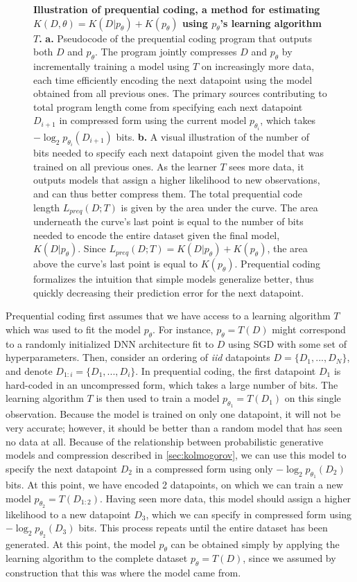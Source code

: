 \documentclass{article} %
\begin{document}
\begin{appendices}
\begin{figure}[ht]
    \caption{\textbf{Illustration of prequential coding, a method for estimating $K(D, \theta) = K(D|p_\theta) + K(p_\theta)$ using $p_\theta$'s learning algorithm $T$.} \textbf{a.} Pseudocode of the prequential coding program that outputs both $D$ and $p_\theta$. The program jointly compresses $D$ and $p_\theta$ by incrementally training a model using $T$ on increasingly more data, each time efficiently encoding the next datapoint using the model obtained from all previous ones. The primary sources contributing to total program length come from specifying each next datapoint $D_{i+1}$ in compressed form using the current model $p_{\theta_i}$, which takes $-\log_2 p_{\theta_i}(D_{i+1})$ bits. \textbf{b.} A visual illustration of the number of bits needed to specify each next datapoint given the model that was trained on all previous ones. As the learner $T$ sees more data, it outputs models that assign a higher likelihood to new observations, and can thus better compress them. The total prequential code length $L_{preq}(D; T)$ is given by the area under the curve. The area underneath the curve's last point is equal to the number of bits needed to encode the entire dataset given the final model, $K(D|p_\theta)$. Since $L_{preq}(D; T) = K(D|p_\theta) + K(p_\theta)$, the area above the curve's last point is equal to $K(p_\theta)$. Prequential coding formalizes the intuition that simple models generalize better, thus quickly decreasing their prediction error for the next datapoint.}
    \label{fig:prequential_coding}
\end{figure}

Prequential coding first assumes that we have access to a learning algorithm $T$ which was used to fit the model $p_\theta$. For instance, $p_\theta = T(D)$ might correspond to a randomly initialized DNN architecture fit to $D$ using SGD with some set of hyperparameters. Then, consider an ordering of \textit{iid} datapoints $D = \{D_1, ..., D_N\}$, and denote $D_{1:i} = \{D_1, ..., D_i\}$. In prequential coding, the first datapoint $D_1$ is hard-coded in an uncompressed form, which takes a large number of bits. The learning algorithm $T$ is then used to train a model $p_{\theta_1} = T(D_1)$ on this single observation. Because the model is trained on only one datapoint, it will not be very accurate; however, it should be better than a random model that has seen no data at all. Because of the relationship between probabilistic generative models and compression described in \cref{sec:kolmogorov}, we can use this model to specify the next datapoint $D_2$ in a compressed form using only $-\log_2 p_{\theta_1}(D_2)$ bits. At this point, we have encoded 2 datapoints, on which we can train a new model $p_{\theta_2} = T(D_{1:2})$. Having seen more data, this model should assign a higher likelihood to a new datapoint $D_3$, which we can specify in compressed form using $-\log_2 p_{\theta_2}(D_3)$ bits. This process repeats until the entire dataset has been generated. At this point, the model $p_\theta$ can be obtained simply by applying the learning algorithm to the complete dataset $p_\theta = T(D)$, since we assumed by construction that this was where the model came from.


\end{appendices}
\end{document}
